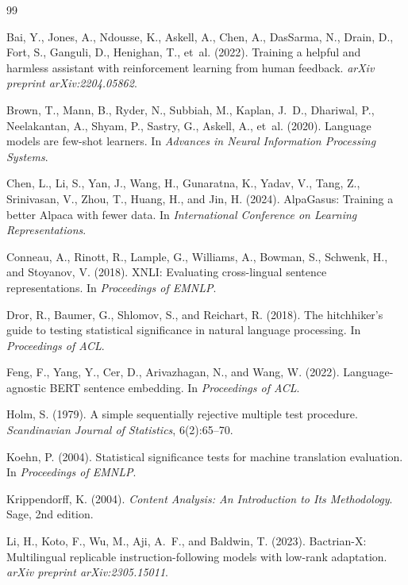 \documentclass{article}
\begin{document}
\begin{thebibliography}{99}

Bai, Y., Jones, A., Ndousse, K., Askell, A., Chen, A., DasSarma, N., Drain, D., Fort, S., Ganguli, D., Henighan, T., et~al. (2022).
Training a helpful and harmless assistant with reinforcement learning from human feedback.
\textit{arXiv preprint arXiv:2204.05862}.

Brown, T., Mann, B., Ryder, N., Subbiah, M., Kaplan, J.~D., Dhariwal, P., Neelakantan, A., Shyam, P., Sastry, G., Askell, A., et~al. (2020).
Language models are few-shot learners.
In \textit{Advances in Neural Information Processing Systems}.

Chen, L., Li, S., Yan, J., Wang, H., Gunaratna, K., Yadav, V., Tang, Z., Srinivasan, V., Zhou, T., Huang, H., and Jin, H. (2024).
AlpaGasus: Training a better Alpaca with fewer data.
In \textit{International Conference on Learning Representations}.

Conneau, A., Rinott, R., Lample, G., Williams, A., Bowman, S., Schwenk, H., and Stoyanov, V. (2018).
XNLI: Evaluating cross-lingual sentence representations.
In \textit{Proceedings of EMNLP}.

Dror, R., Baumer, G., Shlomov, S., and Reichart, R. (2018).
The hitchhiker's guide to testing statistical significance in natural language processing.
In \textit{Proceedings of ACL}.

Feng, F., Yang, Y., Cer, D., Arivazhagan, N., and Wang, W. (2022).
Language-agnostic BERT sentence embedding.
In \textit{Proceedings of ACL}.

Holm, S. (1979).
A simple sequentially rejective multiple test procedure.
\textit{Scandinavian Journal of Statistics}, 6(2):65--70.

Koehn, P. (2004).
Statistical significance tests for machine translation evaluation.
In \textit{Proceedings of EMNLP}.

Krippendorff, K. (2004).
\textit{Content Analysis: An Introduction to Its Methodology}.
Sage, 2nd edition.

Li, H., Koto, F., Wu, M., Aji, A.~F., and Baldwin, T. (2023).
Bactrian-X: Multilingual replicable instruction-following models with low-rank adaptation.
\textit{arXiv preprint arXiv:2305.15011}.


\end{thebibliography}
\end{document}
